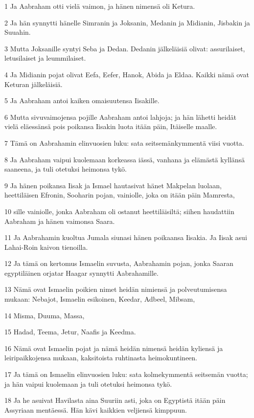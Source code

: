 \par 1 Ja Aabraham otti vielä vaimon, ja hänen nimensä oli Ketura.
\par 2 Ja hän synnytti hänelle Simranin ja Joksanin, Medanin ja Midianin, Jisbakin ja Suuahin.
\par 3 Mutta Joksanille syntyi Seba ja Dedan. Dedanin jälkeläisiä olivat: assurilaiset, letusilaiset ja leummilaiset.
\par 4 Ja Midianin pojat olivat Eefa, Eefer, Hanok, Abida ja Eldaa. Kaikki nämä ovat Keturan jälkeläisiä.
\par 5 Ja Aabraham antoi kaiken omaisuutensa Iisakille.
\par 6 Mutta sivuvaimojensa pojille Aabraham antoi lahjoja; ja hän lähetti heidät vielä eläessänsä pois poikansa Iisakin luota itään päin, Itäiselle maalle.
\par 7 Tämä on Aabrahamin elinvuosien luku: sata seitsemänkymmentä viisi vuotta.
\par 8 Ja Aabraham vaipui kuolemaan korkeassa iässä, vanhana ja elämästä kyllänsä saaneena, ja tuli otetuksi heimonsa tykö.
\par 9 Ja hänen poikansa Iisak ja Ismael hautasivat hänet Makpelan luolaan, heettiläisen Efronin, Sooharin pojan, vainiolle, joka on itään päin Mamresta,
\par 10 sille vainiolle, jonka Aabraham oli ostanut heettiläisiltä; siihen haudattiin Aabraham ja hänen vaimonsa Saara.
\par 11 Ja Aabrahamin kuoltua Jumala siunasi hänen poikaansa Iisakia. Ja Iisak asui Lahai-Roin kaivon tienoilla.
\par 12 Ja tämä on kertomus Ismaelin suvusta, Aabrahamin pojan, jonka Saaran egyptiläinen orjatar Haagar synnytti Aabrahamille.
\par 13 Nämä ovat Ismaelin poikien nimet heidän nimiensä ja polveutumisensa mukaan: Nebajot, Ismaelin esikoinen, Keedar, Adbeel, Mibsam,
\par 14 Misma, Duuma, Massa,
\par 15 Hadad, Teema, Jetur, Naafis ja Keedma.
\par 16 Nämä ovat Ismaelin pojat ja nämä heidän nimensä heidän kyliensä ja leiripaikkojensa mukaan, kaksitoista ruhtinasta heimokuntineen.
\par 17 Ja tämä on Ismaelin elinvuosien luku: sata kolmekymmentä seitsemän vuotta; ja hän vaipui kuolemaan ja tuli otetuksi heimonsa tykö.
\par 18 Ja he asuivat Havilasta aina Suuriin asti, joka on Egyptistä itään päin Assyriaan mentäessä. Hän kävi kaikkien veljiensä kimppuun.
